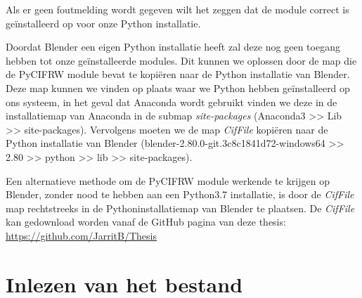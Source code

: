 Als er geen foutmelding wordt gegeven wilt het zeggen dat de module correct is geïnstalleerd op voor onze Python installatie. 
\par
Doordat Blender een eigen Python installatie heeft zal deze nog geen toegang hebben tot onze geïnstalleerde modules. Dit kunnen we oplossen door de map die de PyCIFRW module bevat te kopiëren naar de Python installatie van Blender. Deze map kunnen we vinden op plaats waar we Python hebben geïnstalleerd op ons systeem, in het geval dat Anaconda wordt gebruikt vinden we deze in de installatiemap van Anaconda in de submap \textit{site-packages} (Anaconda3 \textgreater \textgreater{} Lib \textgreater \textgreater{} site-packages).
Vervolgens moeten we de map \textit{CifFile} kopiëren naar de Python installatie van Blender (blender-2.80.0-git.3c8c1841d72-windows64 \textgreater \textgreater{} 2.80 \textgreater \textgreater{} python \textgreater \textgreater{} lib \textgreater \textgreater{} site-packages). 
\par
Een alternatieve methode om de PyCIFRW module werkende te krijgen op Blender, zonder nood te hebben aan een Python3.7 installatie, is door de \textit{CifFile} map rechtstreeks in de Pythoninstallatiemap van Blender te plaatsen. De \textit{CifFile} kan gedownload worden vanaf de GitHub pagina van deze thesis: \url{https://github.com/JarritB/Thesis}
  
\section{Inlezen van het bestand}

